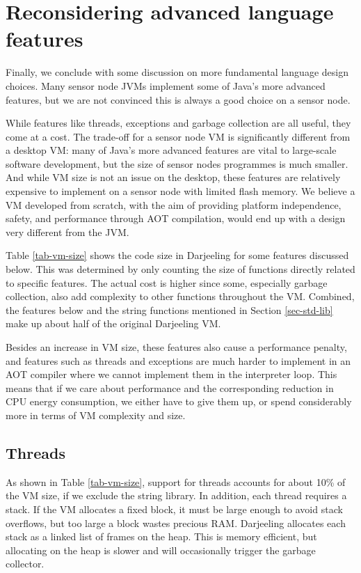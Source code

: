 \section{Reconsidering advanced language features}
\label{sec-advanced-features}
Finally, we conclude with some discussion on more fundamental language design choices. Many sensor node JVMs implement some of Java's more advanced features, but we are not convinced this is always a good choice on a sensor node.

While features like threads, exceptions and garbage collection are all useful, they come at a cost. The trade-off for a sensor node VM is significantly different from a desktop VM: many of Java's more advanced features are vital to large-scale software development, but the size of sensor nodes programmes is much smaller. And while VM size is not an issue on the desktop, these features are relatively expensive to implement on a sensor node with limited flash memory. We believe a VM developed from scratch, with the aim of providing platform independence, safety, and performance through AOT compilation, would end up with a design very different from the JVM.

Table \ref{tab-vm-size} shows the code size in Darjeeling for some features discussed below. This was determined by only counting the size of functions directly related to specific features. The actual cost is higher since some, especially garbage collection, also add complexity to other functions throughout the VM. Combined, the features below and the string functions mentioned in Section \ref{sec-std-lib} make up about half of the original Darjeeling VM.

Besides an increase in VM size, these features also cause a performance penalty, and features such as threads and exceptions are much harder to implement in an AOT compiler where we cannot implement them in the interpreter loop. This means that if we care about performance and the corresponding reduction in CPU energy consumption, we either have to give them up, or spend considerably more in terms of VM complexity and size.


\subsection{Threads}
As shown in Table \ref{tab-vm-size}, support for threads accounts for about 10\% of the VM size, if we exclude the string library. In addition, each thread requires a stack. If the VM allocates a fixed block, it must be large enough to avoid stack overflows, but too large a block wastes precious RAM. Darjeeling allocates each stack as a linked list of frames on the heap. This is memory efficient, but allocating on the heap is slower and will occasionally trigger the garbage collector.

